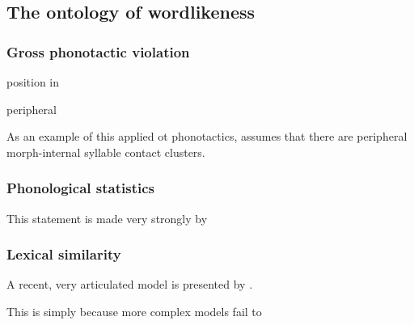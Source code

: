 \subsection{The ontology of wordlikeness}

\subsubsection{Gross phonotactic violation}

position in \citet{SPE}

\citet{Shibatani1973}
\citet{Hooper1973}

peripheral \citep[in the sense of][81]{LGB}

As an example of this applied ot phonotactics, 
\citet{Borowsky1989} assumes that there are peripheral morph-internal syllable contact clusters. 

\subsubsection{Phonological statistics}

\citet{SPE}

This statement is made very strongly by \citet{Coleman1997}

\subsubsection{Lexical similarity}

\citet{LSLT}

\citet{Greenberg1964}
\citet{Ohala1986b}

A recent, very articulated model is presented by \citet{Bailey2001}.

This is simply because more complex models fail to 

